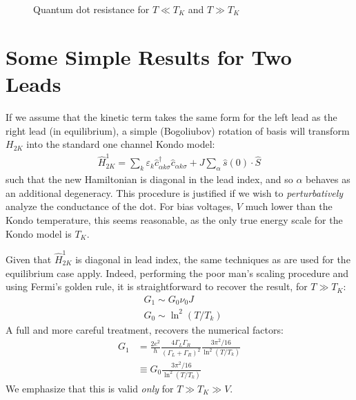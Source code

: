 \documentclass[11pt]{report}
\newcommand{\hH}{\hat{H}}
\newcommand{\D}{^\dagger}
\begin{document}
\begin{figure}
\caption{Quantum dot resistance for $T\ll T_{K}$ and $T\gg T_{K}$
}\label{kondodotresistance}
\end{figure}


\section{Some Simple Results for Two Leads}
If we assume that the kinetic term takes the same form for the left lead as the right lead (in equilibrium), a simple (Bogoliubov) rotation of basis will transform $H_{2K}$ into the standard one channel Kondo model:
\begin{align}\label{kondolies}
  \hH_{2K}^{1}=\sum_{k}\varepsilon_{k}\hat{c}_{\alpha k\sigma}\D\hat{c}_{\alpha k\sigma}+
  J\sum_{\alpha}\hat{s}(0)\cdot\hat{S}
\end{align}
such that the new Hamiltonian is diagonal in the lead index, and so $\alpha$ behaves as an additional degeneracy.  This procedure is justified if we wish to \emph{perturbatively} analyze the conductance of the dot.  For bias voltages, $V$ much lower than the Kondo temperature, this seems reasonable, as the only true energy scale for the Kondo model is $T_{K}$.

Given that $\hH_{2K}^{1}$ is diagonal in lead index, the same techniques as are used for the equilibrium case apply.  Indeed, performing the poor man's scaling procedure and using Fermi's golden rule, it is straightforward to recover the result, for $T\gg T_{K}$:
\begin{align}
  &G_{1}\sim G_{0}\nu_{0}J\nonumber\\
  &G_{0}\sim{\ln^{2}(T/T_{k})}
\end{align}
A full and more careful treatment, recovers the numerical factors:
\begin{align}
  G_{1}&=\frac{2e^{2}}{h}\frac{4\Gamma_{L}\Gamma_{R}}{(\Gamma_{L}+\Gamma_{R})^{2}}\frac{3\pi^{2}/16}{\ln^{2}(T/T_{k})}\nonumber\\
  &\equiv G_{0}\frac{3\pi^{2}/16}{\ln^{2}(T/T_{k})}
\end{align}
We emphasize that this is valid \emph{only} for $T\gg T_{K}\gg V$.
\end{document}
